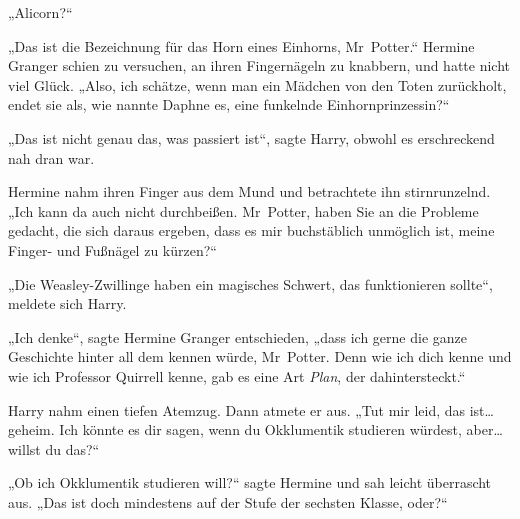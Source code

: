 „Alicorn?“

„Das ist die Bezeichnung für das Horn eines Einhorns, Mr~Potter.“
Hermine Granger schien zu versuchen, an ihren Fingernägeln zu knabbern, und hatte nicht viel Glück. „Also, ich schätze, wenn man ein Mädchen von den Toten zurückholt, endet sie als, wie nannte Daphne es, eine funkelnde Einhornprinzessin?“

„Das ist nicht genau das, was passiert ist“, sagte Harry, obwohl es erschreckend nah dran war.

Hermine nahm ihren Finger aus dem Mund und betrachtete ihn stirnrunzelnd. „Ich kann da auch nicht durchbeißen. Mr~Potter, haben Sie an die Probleme gedacht, die sich daraus ergeben, dass es mir buchstäblich unmöglich ist, meine Finger- und Fußnägel zu kürzen?“

„Die Weasley-Zwillinge haben ein magisches Schwert, das funktionieren sollte“, meldete sich Harry.

„Ich denke“, sagte Hermine Granger entschieden, „dass ich gerne die ganze Geschichte hinter all dem kennen würde, Mr~Potter. Denn wie ich dich kenne und wie ich Professor Quirrell kenne, gab es eine Art \emph{Plan}, der dahintersteckt.“

Harry nahm einen tiefen Atemzug. Dann atmete er aus. „Tut mir leid, das ist… geheim. Ich könnte es dir sagen, wenn du Okklumentik studieren würdest, aber… willst du das?“

„Ob ich Okklumentik studieren will?“ sagte Hermine und sah leicht überrascht aus. „Das ist doch mindestens auf der Stufe der sechsten Klasse, oder?“

